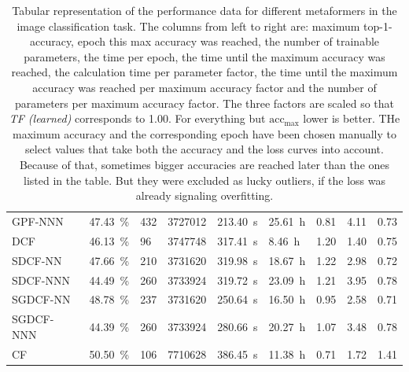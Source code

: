 \begin{table}[htbp]
{\begin{tabular}{l|llllllll}
            GPF-NNN & \SI{47.43}{\percent}  & \SI{432}{} & \SI{3727012}{} & \SI{213.40}{\second} & \SI{25.61}{\hour} & \SI{0.81}{} & \SI{4.11}{} & \SI{0.73}{} \\
            DCF & \SI{46.13}{\percent}  & \SI{96}{} & \SI{3747748}{} & \SI{317.41}{\second} & \SI{8.46}{\hour} & \SI{1.20}{} & \SI{1.40}{} & \SI{0.75}{} \\
            SDCF-NN & \SI{47.66}{\percent}  & \SI{210}{} & \SI{3731620}{} & \SI{319.98}{\second} & \SI{18.67}{\hour} & \SI{1.22}{} & \SI{2.98}{} & \SI{0.72}{} \\
            SDCF-NNN & \SI{44.49}{\percent}  & \SI{260}{} & \SI{3733924}{} & \SI{319.72}{\second} & \SI{23.09}{\hour} & \SI{1.21}{} & \SI{3.95}{} & \SI{0.78}{} \\
            SGDCF-NN & \SI{48.78}{\percent}  & \SI{237}{} & \SI{3731620}{} & \SI{250.64}{\second} & \SI{16.50}{\hour} & \SI{0.95}{} & \SI{2.58}{} & \SI{0.71}{} \\
            SGDCF-NNN & \SI{44.39}{\percent}  & \SI{260}{} & \SI{3733924}{} & \SI{280.66}{\second} & \SI{20.27}{\hour} & \SI{1.07}{} & \SI{3.48}{} & \SI{0.78}{} \\
            CF & \SI{50.50}{\percent}  & \SI{106}{} & \SI{7710628}{} & \SI{386.45}{\second} & \SI{11.38}{\hour} & \SI{0.71}{} & \SI{1.72}{} & \SI{1.41}{} \\
            \bottomrule
        \end{tabular}
    }
    \vspace{0.1cm}
    \caption{Tabular representation of the performance data for different metaformers in the image classification task.
            The columns from left to right are: maximum top-1-accuracy, epoch this max accuracy was reached, the number of trainable parameters, the time per epoch, the time until the maximum accuracy was reached, the calculation time per parameter factor, the time until the maximum accuracy was reached per maximum accuracy factor and the number of parameters per maximum accuracy factor.
            The three factors are scaled so that \emph{TF (learned)} corresponds to \SI{1.00}{}. For everything but $\mathrm{acc}_\mathrm{max}$ lower is better. THe maximum accuracy and the corresponding epoch have been chosen manually to select values that take both the accuracy and the loss curves into account. Because of that, sometimes bigger accuracies are reached later than the ones listed in the table.
            But they were excluded as lucky outliers, if the loss was already signaling overfitting.
    }
    \label{table:overall-comparison-data}
\end{table}

